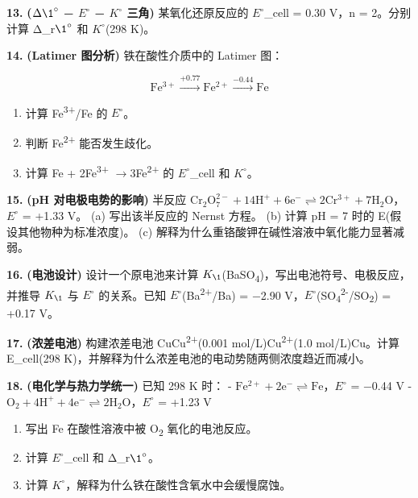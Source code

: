 \documentclass[a4paper,11pt]{ctexart}
\providecommand{\tightlist}{\setlength{\itemsep}{0pt}\setlength{\parskip}{0pt}}
\newcommand{\箭}{\ensuremath{\rightarrow}}
\newcommand{\左箭}{\ensuremath{\leftarrow}}
\newcommand{\上箭}{\ensuremath{\uparrow}}
\newcommand{\下箭}{\ensuremath{\downarrow}}
\newcommand{\衡}{\ensuremath{\rightleftharpoons}}
\newcommand{\双箭}{\ensuremath{\leftrightarrow}}
\newcommand{\约等于}{\ensuremath{\approx}}
\newcommand{\小于等于}{\ensuremath{\leq}}
\newcommand{\大于等于}{\ensuremath{\geq}}
\newcommand{\不等于}{\ensuremath{\neq}}
\newcommand{\西格马}{\ensuremath{\sigma}}
\newcommand{\派}{\ensuremath{\pi}}
\begin{document}
\textbf{13.} \textbf{(\(\Delta \1^{\circ}\) − \(E^{\circ}\) − \(K^{\circ}\) 三角)} 某氧化还原反应的 \(E^{\circ}\)\_cell = 0.30 V，n = 2。分别计算 Δ\_r\(\1^{\circ}\) 和 \(K^{\circ}\)(298 K)。

\textbf{14.} \textbf{(Latimer 图分析)} 铁在酸性介质中的 Latimer 图：

\[\mathrm{Fe^{3+}} \xrightarrow{+0.77} \mathrm{Fe^{2+}} \xrightarrow{-0.44} \mathrm{Fe}\]

\begin{enumerate}
\def\labelenumi{(\alph{enumi})}
\tightlist
\item
  计算 Fe\textsuperscript{3+}/Fe 的 \(E^{\circ}\)。
\item
  判断 Fe\textsuperscript{2+} 能否发生歧化。
\item
  计算 Fe + 2Fe\textsuperscript{3+} \箭 3Fe\textsuperscript{2+} 的 \(E^{\circ}\)\_cell 和 \(K^{\circ}\)。
\end{enumerate}

\textbf{15.} \textbf{(pH 对电极电势的影响)} 半反应 \(\mathrm{Cr_2O_7^{2-} + 14H^+ + 6e^- \rightleftharpoons 2Cr^{3+} + 7H_2O}\)，\(E^{\circ}\) = +1.33 V。
(a) 写出该半反应的 Nernst 方程。
(b) 计算 pH = 7 时的 E(假设其他物种为标准浓度)。
(c) 解释为什么重铬酸钾在碱性溶液中氧化能力显著减弱。

\textbf{16.} \textbf{(电池设计)} 设计一个原电池来计算 \(K_{\1}\)(BaSO\textsubscript{4})，写出电池符号、电极反应，并推导 \(K_{\1}\) 与 \(E^{\circ}\) 的关系。已知 \(E^{\circ}\)(Ba\textsuperscript{2+}/Ba) = −2.90 V，\(E^{\circ}\)(SO\textsubscript{4}\textsuperscript{2-}/SO\textsubscript{2}) = +0.17 V。

\textbf{17.} \textbf{(浓差电池)} 构建浓差电池 Cu\textbar Cu\textsuperscript{2+}(0.001 mol/L)\textbar\textbar Cu\textsuperscript{2+}(1.0 mol/L)\textbar Cu。计算 E\_cell(298 K)，并解释为什么浓差电池的电动势随两侧浓度趋近而减小。

\textbf{18.} \textbf{(电化学与热力学统一)} 已知 298 K 时：
- \(\mathrm{Fe^{2+} + 2e^- \rightleftharpoons Fe}\)，\(E^{\circ}\) = −0.44 V
- \(\mathrm{O_2 + 4H^+ + 4e^- \rightleftharpoons 2H_2O}\)，\(E^{\circ}\) = +1.23 V

\begin{enumerate}
\def\labelenumi{(\alph{enumi})}
\tightlist
\item
  写出 Fe 在酸性溶液中被 O\textsubscript{2} 氧化的电池反应。
\item
  计算 \(E^{\circ}\)\_cell 和 Δ\_r\(\1^{\circ}\)。
\item
  计算 \(K^{\circ}\)，解释为什么铁在酸性含氧水中会缓慢腐蚀。
\end{enumerate}
\end{document}
